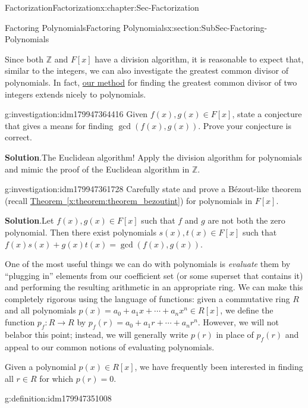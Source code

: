 \documentclass[oneside,10pt,]{book}
\newcommand{\blocktitlefont}{\relax}
\newcommand{\xreffont}{\relax}
\numberwithin{equation}{section}
\def\Z{{\mathbb Z}}
\begin{document}
\begin{chapterptx}{Factorization}{}{Factorization}{}{}{x:chapter:Sec-Factorization}
\begin{sectionptx}{Factoring Polynomials}{}{Factoring Polynomials}{}{}{x:section:SubSec-Factoring-Polynomials}
\par
Since both \(\Z\) and \(F[x]\) have a division algorithm, it is reasonable to expect that, similar to the integers, we can also investigate the greatest common divisor of polynomials. In fact, \hyperref[x:investigation:invest-euclid-alg-integers]{our method} for finding the greatest common divisor of two integers extends nicely to polynomials.%
\begin{investigation}{}{g:investigation:idm179947364416}%
Given \(f(x),g(x)\in F[x]\), state a conjecture that gives a means for finding \(\gcd(f(x),g(x))\). Prove your conjecture is correct.%
\par\smallskip%
\noindent\textbf{\blocktitlefont Solution}.\hypertarget{g:solution:idm179947362720}{}\quad{}The Euclidean algorithm! Apply the division algorithm for polynomials and mimic the proof of the Euclidean algorithm in \(\Z\).%
\end{investigation}
\begin{investigation}{}{g:investigation:idm179947361728}%
Carefully state and prove a Bézout-like theorem (recall \hyperref[x:theorem:theorem_bezoutint]{Theorem~{\xreffont\ref{x:theorem:theorem_bezoutint}}}) for polynomials in \(F[x]\).%
\par\smallskip%
\noindent\textbf{\blocktitlefont Solution}.\hypertarget{g:solution:idm179947360064}{}\quad{}Let \(f(x),
g(x)\in F[x]\) such that \(f\) and \(g\) are not both the zero polynomial. Then there exist polynomials \(s(x),
t(x)\in F[x]\) such that \(f(x) s(x) + g(x) t(x) = \gcd(f(x),g(x))\).%
\end{investigation}
One of the most useful things we can do with polynomials is \emph{evaluate} them by ``plugging in'' elements from our coefficient set (or some superset that contains it) and performing the resulting arithmetic in an appropriate ring. We can make this completely rigorous using the language of functions: given a commutative ring \(R\) and all polynomials \(p(x) = a_0 + a_1 x + \cdots + a_n x^n \in R[x]\), we define the function \(p_f : R\to R\) by \(p_f(r) = a_0 + a_1 r + \cdots + a_n r^n \). However, we will not belabor this point; instead, we will generally write \(p(r)\) in place of \(p_f(r)\) and appeal to our common notions of evaluating polynomials.%
\par
Given a polynomial \(p(x)\in R[x]\), we have frequently been interested in finding all \(r\in R\) for which \(p(r) = 0\).%
\begin{definition}{}{g:definition:idm179947351008}%
%
%

\end{definition}
\end{sectionptx}
\end{chapterptx}
\end{document}
